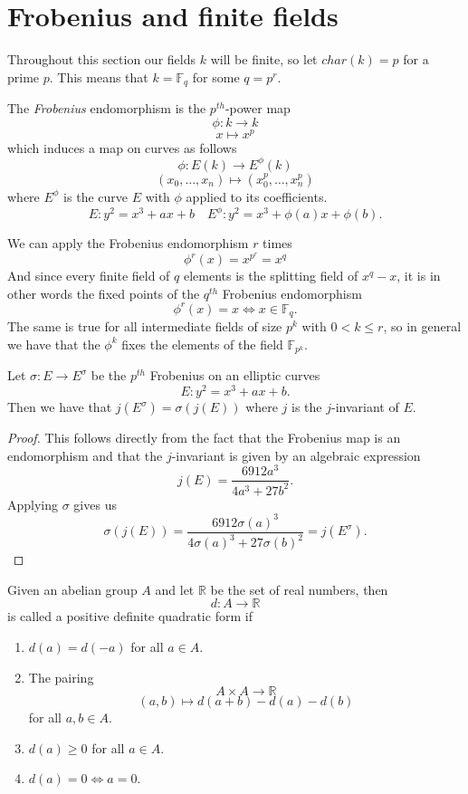 \section{Frobenius and finite fields} \label{frob}
Throughout this section our fields $k$ will be finite, so let $char(k) = p$ for
a prime $p$. This means that $k = \mathbb{F}_{q}$ for some $q = p^r$.

\begin{mydef}
 The \emph{Frobenius} endomorphism is the $p^{th}$-power map
$$ \phi: k \rightarrow k $$
$$ x \mapsto x^p $$
which induces a map on curves as follows
$$ \phi: E(k) \rightarrow E^{\phi}(k) $$
$$ (x_0,\ldots , x_n) \mapsto (x_0^p, \ldots , x_n^p) $$
where $E^{\phi}$ is the curve $E$ with $\phi$ applied to its coefficients.
$$E: y^2 = x^3 + ax + b \quad E^{\phi}: y^2 = x^3 + \phi(a)x + \phi(b). $$
\end{mydef}

We can apply the Frobenius endomorphism $r$ times $$\phi^r(x) = x^{p^r} = x^q$$
And since every finite field of $q$ elements is the splitting field of $x^{q}-x$, it is in other words
the fixed points of the $q^{th}$ Frobenius endomorphism
$$ \phi^r(x) = x \iff x \in \mathbb{F}_q. $$
The same is true for all intermediate fields of size $p^k$ with $0 < k \leq r$, so in general
we have that the $\phi^k$ fixes the elements of the field $\mathbb{F}_{p^k}$.

\begin{prop}
 Let $\sigma: E \rightarrow E^\sigma$ be the $p^{th}$ Frobenius on an elliptic curves
  $$ E: y^2 = x^3 + ax + b.$$
Then we have that $j(E^\sigma) = \sigma(j(E))$ where $j$ is the $j$-invariant of $E$.
\end{prop}
\begin{proof}
 This follows directly from the fact that the Frobenius map is an endomorphism and that
the $j$-invariant is given by an algebraic expression \cite{AEC}
$$j(E) = \frac{6912 a^3}{4a^3 + 27b^2}.$$ 
Applying $\sigma$ gives us
$$\sigma(j(E)) = \frac{6912 \sigma(a)^3}{4\sigma(a)^3 + 27 \sigma(b)^2} = j(E^\sigma).$$
\end{proof}

\begin{mydef}
 Given an abelian group $A$ and let $\mathbb{R}$ be the set of real numbers, then
$$d: A \rightarrow \mathbb{R}$$
is called a positive definite quadratic form if
\begin{enumerate}
 \item $d(a) = d(-a)$ for all $a\in A$.
 \item The pairing $$A\times A\rightarrow \mathbb{R}$$
		   $$ (a,b) \mapsto d(a+b)-d(a)-d(b) $$ for all $a,b\in A$.
 \item $d(a) \geq 0$ for all $a\in A$.
 \item $d(a) = 0 \iff a=0$.
\end{enumerate}
\end{mydef}

